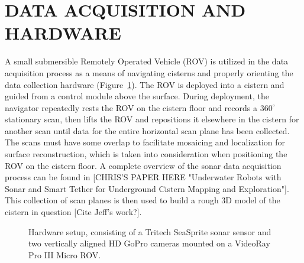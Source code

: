 \documentclass[a4paper,twoside]{article}
\begin{document}



\section{\uppercase{Data Acquisition and Hardware}}
\label{sec:data}


\noindent A small submersible Remotely Operated Vehicle (ROV) is utilized in the data acquisition process as a means of navigating cisterns and properly orienting the data collection hardware (Figure~\ref{fig:ROV}). The ROV is deployed into a cistern and guided from a control module above the surface. During deployment, the navigator repeatedly rests the ROV on the cistern floor and records a $360^{\circ}$ stationary scan, then lifts the ROV and repositions it elsewhere in the cistern for another scan until data for the entire horizontal scan plane has been collected. The scans must have some overlap to facilitate mosaicing and localization for surface reconstruction, which is taken into consideration when positioning the ROV on the cistern floor. A complete overview of the sonar data acquisition process can be found in [CHRIS'S PAPER HERE "Underwater Robots with Sonar and Smart Tether for Underground Cistern Mapping and Exploration"].  This collection of scan planes is then used to build a rough 3D model of the cistern in question [Cite Jeff's work?].  
\begin{figure}[!h]
   \vspace{-0.2cm}
   \caption{Hardware setup, consisting of a Tritech SeaSprite sonar sensor and two vertically aligned HD GoPro cameras mounted on a VideoRay Pro III Micro ROV.}
  \label{fig:ROV}
 \end{figure}
\end{document}
